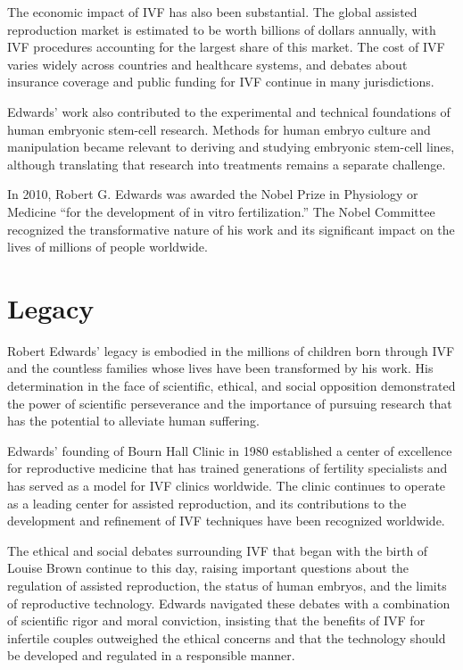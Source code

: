 The economic impact of IVF has also been substantial. The global assisted reproduction market is estimated to be worth billions of dollars annually, with IVF procedures accounting for the largest share of this market. The cost of IVF varies widely across countries and healthcare systems, and debates about insurance coverage and public funding for IVF continue in many jurisdictions.

Edwards' work also contributed to the experimental and technical foundations of human embryonic stem-cell research. Methods for human embryo culture and manipulation became relevant to deriving and studying embryonic stem-cell lines, although translating that research into treatments remains a separate challenge.

In 2010, Robert G. Edwards was awarded the Nobel Prize in Physiology or Medicine ``for the development of in vitro fertilization.'' The Nobel Committee recognized the transformative nature of his work and its significant impact on the lives of millions of people worldwide.

\section{Legacy}

Robert Edwards' legacy is embodied in the millions of children born through IVF and the countless families whose lives have been transformed by his work. His determination in the face of scientific, ethical, and social opposition demonstrated the power of scientific perseverance and the importance of pursuing research that has the potential to alleviate human suffering.

Edwards' founding of Bourn Hall Clinic in 1980 established a center of excellence for reproductive medicine that has trained generations of fertility specialists and has served as a model for IVF clinics worldwide. The clinic continues to operate as a leading center for assisted reproduction, and its contributions to the development and refinement of IVF techniques have been recognized worldwide.

The ethical and social debates surrounding IVF that began with the birth of Louise Brown continue to this day, raising important questions about the regulation of assisted reproduction, the status of human embryos, and the limits of reproductive technology. Edwards navigated these debates with a combination of scientific rigor and moral conviction, insisting that the benefits of IVF for infertile couples outweighed the ethical concerns and that the technology should be developed and regulated in a responsible manner.

